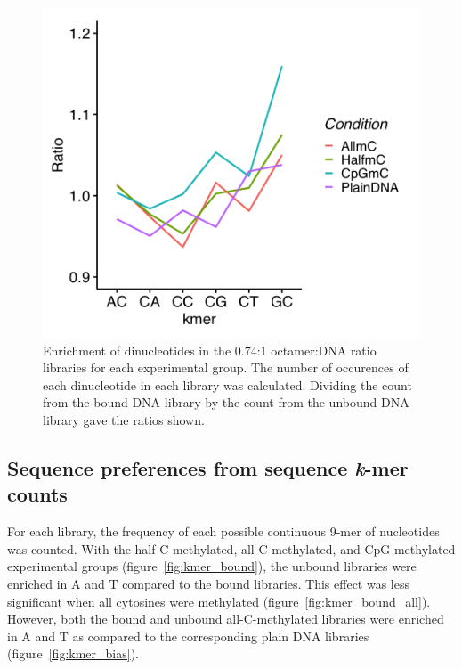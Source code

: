 \documentclass[parskip=full, numbers=noenddot]{scrreprt}
\begin{document}
\begin{figure}[htpb]
  \centering
  \includegraphics[width=\textwidth]{c2nt}
  \caption{Enrichment of dinucleotides in the 0.74:1 octamer:DNA ratio libraries for each experimental group.  The number of occurences of each dinucleotide in each library was calculated.  Dividing the count from the bound DNA library by the count from the unbound DNA library gave the ratios shown.} 
  \label{fig:c2nt}
\end{figure}

\subsection{Sequence preferences from sequence \emph{k}-mer counts}
\label{ssec:nuseqpref_kmer}

For each library, the frequency of each possible continuous 9-mer of nucleotides was counted.  With the half-C-methylated, all-C-methylated, and CpG-methylated experimental groups (figure~\ref{fig:kmer_bound}), the unbound libraries were enriched in A and T compared to the bound libraries.  This effect was less significant when all cytosines were methylated (figure~\ref{fig:kmer_bound_all}).  However, both the bound and unbound all-C-methylated libraries were enriched in A and T as compared to the corresponding plain DNA libraries (figure~\ref{fig:kmer_bias}). %
\end{document}
